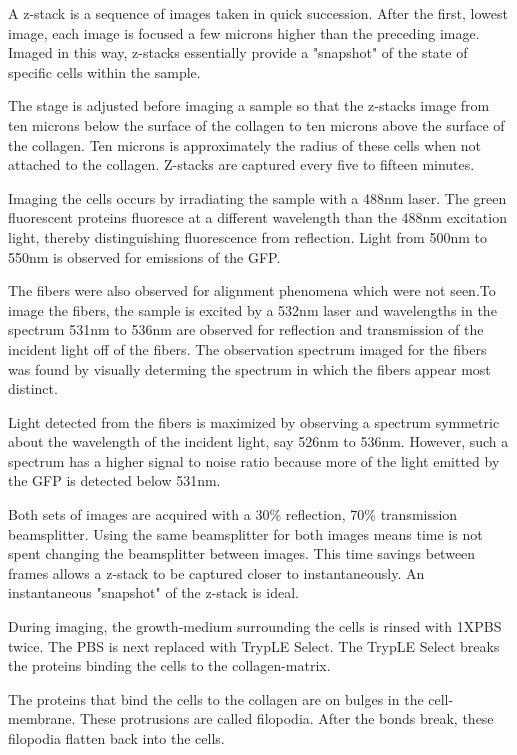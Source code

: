 \documentclass[twocolumn,notitlepage]{revtex4-1}
\begin{document}
A z-stack is a sequence of images taken in quick succession. After the first, lowest image, each image is focused a few microns higher than the preceding image. Imaged in this way, z-stacks essentially provide a "snapshot" of the state of specific cells within the sample.

The stage is adjusted before imaging a sample so that the z-stacks image from ten microns below the surface of the collagen to ten microns above the surface of the collagen. Ten microns is approximately the radius of these cells when not attached to the collagen. Z-stacks are captured every five to fifteen minutes.

Imaging the cells occurs by irradiating the sample with a 488nm laser. The green fluorescent proteins fluoresce at a different wavelength than the 488nm excitation light, thereby distinguishing fluorescence from reflection. Light from 500nm to 550nm is observed for emissions of the GFP. 

The fibers were also observed for alignment phenomena which were not seen.To image the fibers, the sample is excited by a 532nm laser and wavelengths in the spectrum 531nm to 536nm are observed for reflection and transmission of the incident light off of the fibers. The observation spectrum imaged for the fibers was found by visually determing the spectrum in which the fibers appear most distinct.

Light detected from the fibers is maximized by observing a spectrum symmetric about the wavelength of the incident light, say 526nm to 536nm. However, such a spectrum has a higher signal to noise ratio because more of the light emitted by the GFP is detected below 531nm.

Both sets of images are acquired with a 30\% reflection, 70\% transmission beamsplitter. Using the same beamsplitter for both images means time is not spent changing the beamsplitter between images. This time savings between frames allows a z-stack to be captured closer to instantaneously. An instantaneous "snapshot" of the z-stack is ideal. 

During imaging, the growth-medium surrounding the cells is rinsed with 1XPBS twice. The PBS is next replaced with TrypLE Select. The TrypLE Select breaks the proteins binding the cells to the collagen-matrix.

The proteins that bind the cells to the collagen are on bulges in the cell-membrane. These protrusions are called filopodia. After the bonds break, these filopodia flatten back into the cells.
\end{document}
